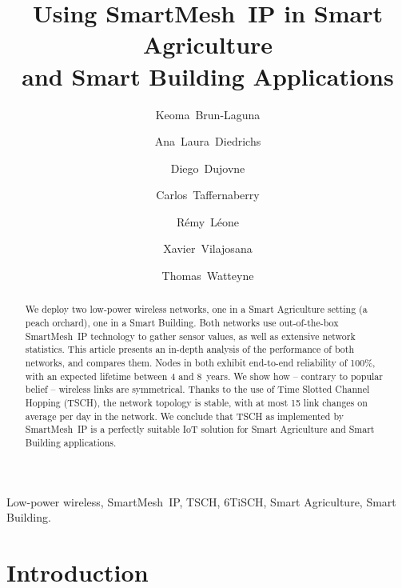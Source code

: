 \documentclass{elsarticle}
\newcommand{\smip}                {SmartMesh~IP\xspace}
\newcommand{\building}            {Smart Building\xspace}
\newcommand{\agri}                {Smart Agriculture\xspace}
\begin{document}
\begin{frontmatter}

\date{}

\title{Using \smip in \agri \\ and \building Applications}

\author[inria]{Keoma~Brun-Laguna}
\author[utn,conicet]{Ana~Laura~Diedrichs}
\author[udp]{Diego~Dujovne}
\author[utn]{Carlos~Taffernaberry}
\author[inria]{R\'emy~L\'eone}
\author[uoc]{Xavier~Vilajosana}
\author[inria]{Thomas~Watteyne}

\address[inria]{~Inria, EVA team, Paris, France}
\address[utn]{~Universidad Tecnol\'ogica Nacional (UTN), Mendoza, Argentina}
\address[udp]{~Universidad Diego Portales, Santiago, Chile}
\address[uoc]{~Universitat Oberta de Catalunya, Barcelona, Catalonia, Spain}
\address[conicet]{~CONICET, Mendoza, Argentina}

\begin{abstract}
We deploy two low-power wireless networks, one in a \agri setting (a peach orchard), one in a \building.
Both networks use out-of-the-box \smip technology to gather sensor values, as well as extensive network statistics.
This article presents an in-depth analysis of the performance of both networks, and compares them.
Nodes in both exhibit end-to-end reliability of 100\%, with an expected lifetime between 4 and 8~years.
We show how -- contrary to popular belief -- wireless links are symmetrical.
Thanks to the use of Time Slotted Channel Hopping (TSCH), the network topology is stable, with at most 15 link changes on average per day in the network.
We conclude that TSCH as implemented by \smip is a perfectly suitable IoT solution for \agri and \building applications.
\end{abstract}

\begin{keyword}
Low-power wireless, \smip, TSCH, 6TiSCH, \agri, \building.
\end{keyword}

\end{frontmatter}

\section{Introduction}
\label{sec:intro}
\end{document}
